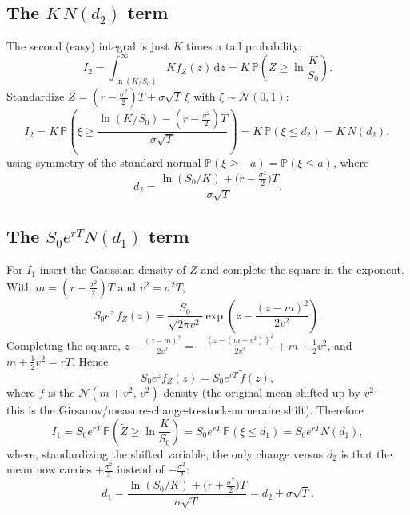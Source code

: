 \documentclass[11pt]{article}
\newcommand{\dd}{\,\mathrm{d}}
\begin{document}
\subsection{The $K\,N(d_2)$ term}
The second (easy) integral is just $K$ times a tail probability:
\begin{equation}
I_2 = \int_{\ln(K/S_0)}^{\infty} K f_Z(z)\dd z = K\,\mathbb P\!\left(Z \ge \ln\frac{K}{S_0}\right).
\end{equation}
Standardize $Z = (r-\tfrac{\sigma^2}{2})T + \sigma\sqrt{T}\,\xi$ with $\xi\sim\mathcal N(0,1)$:
\begin{equation}
I_2 = K\,\mathbb P\!\left(\xi \ge \frac{\ln(K/S_0) - (r-\tfrac{\sigma^2}{2})T}{\sigma\sqrt T}\right)
= K\,\mathbb P(\xi \le d_2) = K\,N(d_2),
\end{equation}
using symmetry of the standard normal $\mathbb P(\xi\ge -a) = \mathbb P(\xi\le a)$, where
\begin{equation}
d_2 = \frac{\ln(S_0/K) + \bigl(r-\tfrac{\sigma^2}{2}\bigr)T}{\sigma\sqrt T}.
\end{equation}

\subsection{The $S_0 e^{rT} N(d_1)$ term}
For $I_1$ insert the Gaussian density of $Z$ and complete the square in the exponent. With
$m = (r-\tfrac{\sigma^2}{2})T$ and $v^2=\sigma^2 T$,
\begin{equation}
S_0 e^{z}\,f_Z(z)
= \frac{S_0}{\sqrt{2\pi v^2}}\exp\!\left(z - \frac{(z-m)^2}{2v^2}\right).
\end{equation}
Completing the square, $z - \tfrac{(z-m)^2}{2v^2} = -\tfrac{(z-(m+v^2))^2}{2v^2} + m + \tfrac12 v^2$,
and $m + \tfrac12 v^2 = rT$. Hence
\begin{equation}
S_0 e^{z} f_Z(z) = S_0 e^{rT}\,\tilde f(z),
\end{equation}
where $\tilde f$ is the $\mathcal N(m+v^2,\,v^2)$ density (the original mean shifted up by $v^2$ ---
this is the Girsanov/measure-change-to-stock-numeraire shift). Therefore
\begin{equation}
I_1 = S_0 e^{rT}\,\mathbb P\!\left(\tilde Z \ge \ln\frac{K}{S_0}\right)
= S_0 e^{rT}\,\mathbb P(\xi \le d_1) = S_0 e^{rT} N(d_1),
\end{equation}
where, standardizing the shifted variable, the only change versus $d_2$ is that the mean now carries
$+\tfrac{\sigma^2}{2}$ instead of $-\tfrac{\sigma^2}{2}$:
\begin{equation}
d_1 = \frac{\ln(S_0/K) + \bigl(r+\tfrac{\sigma^2}{2}\bigr)T}{\sigma\sqrt T}
= d_2 + \sigma\sqrt T.
\end{equation}
\end{document}

